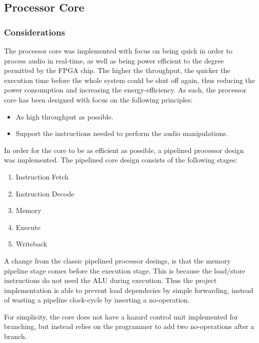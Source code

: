 \FloatBarrier
\subsection{Processor Core}\label{subsec:fpga-processor-core}

\subsubsection{Considerations}

The processor core was implemented with focus on being quick in order to process
audio in real-time, as well as being power efficient to the degree permitted by
the FPGA chip. The higher the throughput, the quicker the execution time before
the whole system could be shut off again, thus reducing the power
consumption and increasing the energy-efficiency. As such, the processor core has been
designed with focus on the following principles:

\begin{itemize}
	\item As high throughput as possible.
	\item Support the instructions needed to perform the audio manipulations.
\end{itemize}

In order for the core to be as efficient as possible, a pipelined processor
design was implemented. The pipelined core design consists of the following
stages:

\begin{enumerate}
	\item Instruction Fetch \label{stage:if}
	\item Instruction Decode \label{stage:id}
	\item Memory \label{stage:mem}
	\item Execute \label{stage:ex}
	\item Writeback \label{stage:wb}
\end{enumerate}

A change from the classic pipelined processor desings, is that the memory
pipeline stage comes before the execution stage. This is because the load/store
instructions do not need the ALU during execution. Thus the project
implementation is able to prevent load dependecies by simple forwarding, instead
of wasting a pipeline clock-cycle by inserting a no-operation.

For simplicity, the core does not have a hazard control unit implemented for
branching, but instead relies on the programmer to add two no-operations after a
branch.

